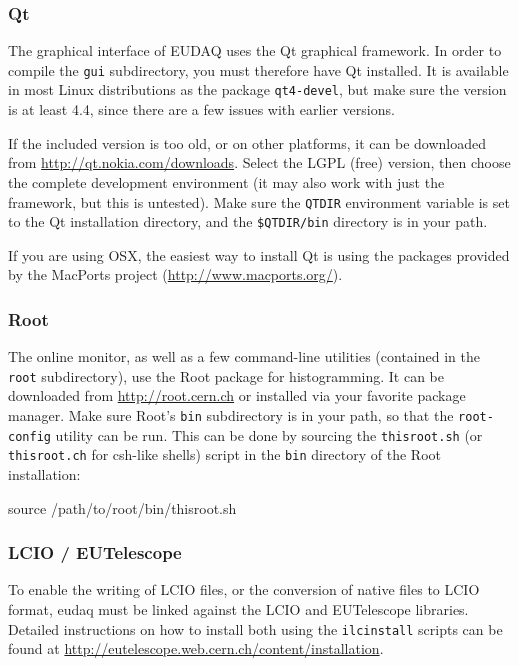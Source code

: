 \subsubsection{Qt}
The graphical interface of EUDAQ uses the Qt graphical framework.
In order to compile the \texttt{gui} subdirectory, you must therefore have Qt installed.
It is available in most Linux distributions as the package \texttt{qt4-devel},
but make sure the version is at least 4.4, since there are a few issues with earlier versions.

If the included version is too old, or on other platforms,
it can be downloaded from \url{http://qt.nokia.com/downloads}.
Select the LGPL (free) version, then choose the complete development environment
(it may also work with just the framework, but this is untested).
Make sure the \texttt{QTDIR} environment variable is set to the Qt installation directory,
and the \texttt{\$QTDIR/bin} directory is in your path.

If you are using OSX, the easiest way to install Qt is using the
packages provided by the MacPorts project (\url{http://www.macports.org/}).

\subsubsection{Root}\label{sec:Root}
The online monitor, as well as a few command-line utilities (contained in the \texttt{root} subdirectory),
use the Root package for histogramming.
It can be downloaded from \url{http://root.cern.ch} or installed via
your favorite package manager.
Make sure Root's \texttt{bin} subdirectory is in your path, so that the \texttt{root-config} utility can be run.
This can be done by sourcing the \texttt{thisroot.sh} (or \texttt{thisroot.ch} for csh-like shells)
script in the \texttt{bin} directory of the Root installation:
\begin{listing}[mybash]
source /path/to/root/bin/thisroot.sh
\end{listing}

\subsubsection{LCIO / EUTelescope}\label{sec:LCIO-EUTel}
To enable the writing of \gls{LCIO} files, or the conversion of native files to \gls{LCIO} format,
eudaq must be linked against the \gls{LCIO} and EUTelescope libraries.
Detailed instructions on how to install both using the
\texttt{ilcinstall} scripts can be found at \url{http://eutelescope.web.cern.ch/content/installation}.

